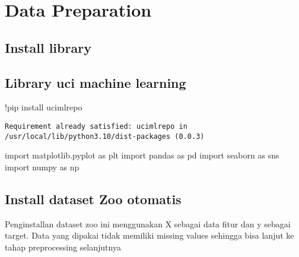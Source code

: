 \documentclass[
  letterpaper,
]{krantz}
\makeatletter
\newenvironment{Shaded}{\begin{snugshade}}{\end{snugshade}}
\newcommand{\ImportTok}[1]{\textcolor[rgb]{0.00,0.46,0.62}{#1}}
\newcommand{\NormalTok}[1]{\textcolor[rgb]{0.00,0.23,0.31}{#1}}
\newcommand{\OperatorTok}[1]{\textcolor[rgb]{0.37,0.37,0.37}{#1}}
\newenvironment{kframe}{%
\medskip{}
\setlength{\fboxsep}{.8em}
 \def\at@end@of@kframe{}%
 \ifinner\ifhmode%
  \def\at@end@of@kframe{\end{minipage}}%
  \begin{minipage}{\columnwidth}%
 \fi\fi%
 \def\FrameCommand##1{\hskip\@totalleftmargin \hskip-\fboxsep
 \colorbox{shadecolor}{##1}\hskip-\fboxsep
     \hskip-\linewidth \hskip-\@totalleftmargin \hskip\columnwidth}%
 \MakeFramed {\advance\hsize-\width
   \@totalleftmargin\z@ \linewidth\hsize
   \@setminipage}}%
 {\par\unskip\endMakeFramed%
 \at@end@of@kframe}
\renewenvironment{Shaded}{\begin{kframe}}{\end{kframe}}
\makeatother
\begin{document}
\hypertarget{data-preparation}{%
\section{Data Preparation}\label{data-preparation}}

\hypertarget{install-library}{%
\subsection{Install library}\label{install-library}}

\hypertarget{library-uci-machine-learning}{%
\subsection{Library uci machine
learning}\label{library-uci-machine-learning}}

\begin{Shaded}
\begin{Highlighting}[]
\OperatorTok{!}\NormalTok{pip install ucimlrepo}
\end{Highlighting}
\end{Shaded}

\begin{verbatim}
Requirement already satisfied: ucimlrepo in /usr/local/lib/python3.10/dist-packages (0.0.3)
\end{verbatim}

\begin{Shaded}
\begin{Highlighting}[]
\ImportTok{import}\NormalTok{ matplotlib.pyplot }\ImportTok{as}\NormalTok{ plt}
\ImportTok{import}\NormalTok{ pandas }\ImportTok{as}\NormalTok{ pd}
\ImportTok{import}\NormalTok{ seaborn }\ImportTok{as}\NormalTok{ sns}
\ImportTok{import}\NormalTok{ numpy }\ImportTok{as}\NormalTok{ np}
\end{Highlighting}
\end{Shaded}

\hypertarget{install-dataset-zoo-otomatis}{%
\subsection{Install dataset Zoo
otomatis}\label{install-dataset-zoo-otomatis}}

Penginstallan dataset zoo ini menggunakan X sebagai data fitur dan y
sebagai target. Data yang dipakai tidak memiliki missing values sehingga
bisa lanjut ke tahap preprocessing selanjutnya
\end{document}
